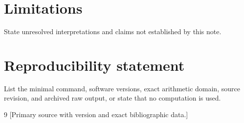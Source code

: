 \documentclass[11pt]{article}
\theoremstyle{remark}
\begin{document}
\section{Limitations}
State unresolved interpretations and claims not established by this note.

\section*{Reproducibility statement}
List the minimal command, software versions, exact arithmetic domain, source
revision, and archived raw output, or state that no computation is used.

\begin{thebibliography}{9}
 [Primary source with version and exact bibliographic data.]
\end{thebibliography}
\end{document}
